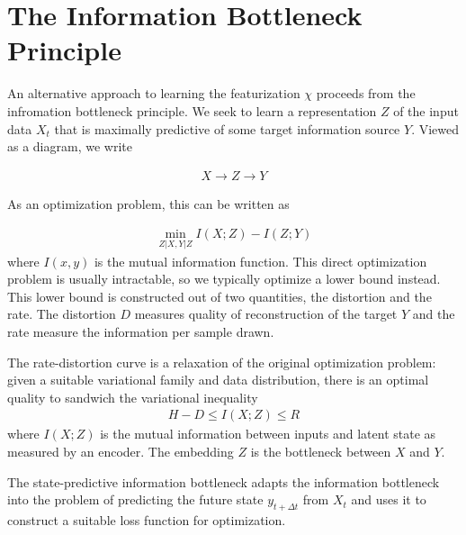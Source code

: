 \documentclass[book.tex]{subfiles}
\begin{document}
\section{The Information Bottleneck Principle}

An alternative approach to learning the featurization $\chi$ proceeds from the infromation bottleneck principle. We seek to learn a representation $Z$ of the input data $X_t$ that is maximally predictive of some target information source $Y$. Viewed as a diagram, we write

\begin{align}
    X \to Z \to Y
\end{align}

As an optimization problem, this can be written as

\begin{align}
    \min_{Z|X, Y|Z} I(X;Z) - I(Z;Y)
\end{align}
where $I(x, y)$ is the mutual information function. This direct optimization problem is usually intractable, so we typically optimize a lower bound instead. This lower bound is constructed out of two quantities, the distortion and the rate. The distortion $D$ measures quality of reconstruction of the target $Y$ and the rate measure the information per sample drawn.


The rate-distortion curve is a relaxation of the original optimization problem: given a suitable variational family and data distribution, there is an optimal quality to sandwich the variational inequality
\begin{align}
    H - D \leq I(X; Z) \leq R
\end{align}
where $I(X; Z)$ is the mutual information between inputs and latent state as measured by an encoder. The embedding $Z$ is the bottleneck between $X$ and $Y$. 

The state-predictive information bottleneck adapts the information bottleneck into the problem of predicting the future state $y_{t+\Delta t}$ from $X_t$ and uses it to construct a suitable loss function for optimization.

\end{document}
